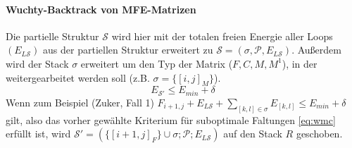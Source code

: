 \paragraph{Wuchty-Backtrack von MFE-Matrizen}
Die partielle Struktur $\mathcal{S}$ wird hier mit der totalen 
freien Energie aller Loops $(E_{L\mathcal{S}})$ aus der partiellen Struktur erweitert 
zu $\mathcal{S}=(\sigma,\mathcal{P}, E_{L\mathcal{S}})$.
Außerdem wird der Stack $\sigma$ erweitert um den Typ der Matrix ($F, C, M, M^1$), 
in der weitergearbeitet werden soll (z.B. $\sigma = \{[i,j]_{M}\}$). 
\begin{equation} \label{eq:wmc}
	E_{\mathcal{S}'} \leqslant E_{min} + \delta
\end{equation}
Wenn zum Beispiel (Zuker, Fall 1)
$F_{i+1,j} + E_{L\mathcal{S}} + \sum_{[k,l] \in \sigma} E_{[k,l]} \leqslant E_{min} + \delta$ 
gilt, also das vorher gew\"ahlte Kriterium f\"ur suboptimale Faltungen \eqref{eq:wmc} 
erf\"ullt ist, 
wird $\mathcal{S}' = (\{[i+1,j]_F\} \cup \sigma; \mathcal{P}; E_{L\mathcal{S}})$ auf den 
Stack $R$ geschoben.

